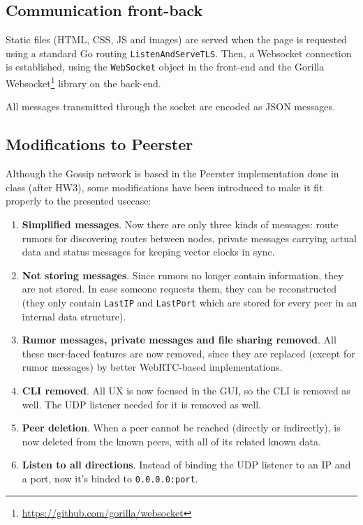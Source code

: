 \documentclass[paper=a4, fontsize=11pt]{scrartcl} %
\numberwithin{equation}{section} %
\numberwithin{figure}{section} %
\numberwithin{table}{section} %
\begin{document}
\subsection{Communication front-back}

Static files (HTML, CSS, JS and images) are served when the page is requested using a standard Go routing \verb|ListenAndServeTLS|. Then, a Websocket connection is established, using the \verb|WebSocket| object in the front-end and the Gorilla Websocket\footnote{\url{https://github.com/gorilla/websocket}} library on the back-end. 

All messages transmitted through the socket are encoded as JSON messages.

\subsection{Modifications to Peerster}

Although the Gossip network is based in the Peerster implementation done in class (after HW3), some modifications have been introduced to make it fit properly to the presented usecase:

\begin{enumerate}
	\item \textbf{Simplified messages}. Now there are only three kinds of messages: route rumors for discovering routes between nodes, private messages carrying actual data and status messages for keeping vector clocks in sync.
	\item \textbf{Not storing messages}. Since rumors no longer contain information, they are not stored. In case someone requests them, they can be reconstructed (they only contain \verb|LastIP| and \verb|LastPort| which are stored for every peer in an internal data structure).
	\item \textbf{Rumor messages, private messages and file sharing removed}. All these user-faced features are now removed, since they are replaced (except for rumor messages) by better WebRTC-based implementations.
	\item \textbf{CLI removed}. All UX is now focused in the GUI, so the CLI is removed as well. The UDP listener needed for it is removed as well.
	\item \textbf{Peer deletion}. When a peer cannot be reached (directly or indirectly), is now deleted from the known peers, with all of its related known data.
	\item \textbf{Listen to all directions}. Instead of binding the UDP listener to an IP and a port, now it's binded to \verb|0.0.0.0:port|.
\end{enumerate}
\end{document}
